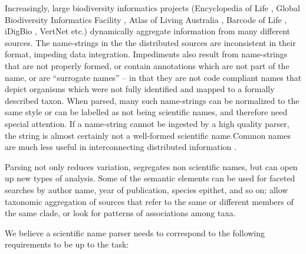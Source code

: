 \documentclass{bmcart}
\begin{document}
Increasingly, large biodiversity informatics projects (Encyclopedia of Life
\cite{eol}, Global Biodiversity Informatics Facility \cite{gbif}, Atlas of
Living Australia \cite{ala}, Barcode of Life \cite{bold}, iDigBio
\cite{idigbio}, VertNet \cite{vertnet} etc.) dynamically aggregate information
from many different sources. The name-strings in the the distributed sources
are inconsistent in their format, impeding data integration. Impediments also
result from name-strings that are not properly formed, or contain annotations
which are not part of the name, or are ``surrogate names'' – in that they are
not code compliant names that depict organisms which were not fully identified
and mapped to a formally described taxon. When parsed, many such name-strings
can be normalized to the same style or can be labelled as not being scientific
names, and therefore need special attention.  If a name-string cannot be
ingested by a high quality parser, the string is almost certainly not a
well-formed scientific name.Common names are much less useful in
interconnecting distributed information \cite{Patterson:inpress-a}.

Parsing not only reduces variation, segregates non scientific names, but can
open up new types of analysis.  Some of the semantic elements can be used for
faceted searches by author name, year of publication, species epithet, and so
on; allow taxonomic aggregation of sources that refer to the same or different
members of the same clade, or look for patterns of associations among taxa.

We believe a scientific name parser needs to correspond
to the following requirements to be up to the task:
\end{document}
